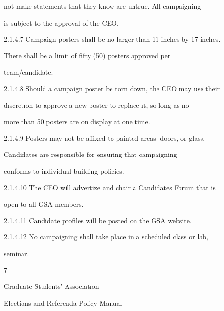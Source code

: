                not make statements that they know are untrue. All campaigning  

               is subject to the approval of the CEO.   

  

2.1.4.7        Campaign posters shall be no larger than 11 inches by 17 inches.  

               There   shall   be   a   limit   of   fifty   (50)   posters   approved   per  

               team/candidate.   

  

2.1.4.8        Should a campaign poster be torn down, the CEO may use their  

               discretion  to  approve  a  new  poster  to  replace  it,  so  long  as  no  

               more than 50 posters are on display at one time.   

  

2.1.4.9        Posters  may  not  be  affixed  to  painted  areas,  doors,  or  glass.  

               Candidates         are    responsible        for    ensuring       that    campaigning  

               conforms to individual building policies.   

  

2.1.4.10       The  CEO  will  advertize  and  chair  a  Candidates  Forum  that  is  

               open to all GSA members.   

  

2.1.4.11       Candidate profiles will be posted on the GSA website.   

  

2.1.4.12       No  campaigning  shall  take  place  in  a  scheduled  class  or  lab,  

               seminar.   



                                                      7  

                                                                                                              

                                Graduate Students’ Association  

                          Elections and Referenda Policy Manual  

  


